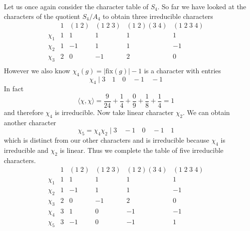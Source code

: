 \documentclass[11pt, notitlepage]{article}
\numberwithin{equation}{section}
\theoremstyle{plain}
\theoremstyle{definition}
\newenvironment{example}
	{\pushQED{\qed}\renewcommand{\qedsymbol}{$\blacktriangleleft$}\examplex}
	{\popQED\endexamplex}
\begin{document}
\begin{example}
Let us once again consider the character table of $S_4$. So far we have looked at the characters of the quotient $S_4/A_4$ to obtain three irreducible characters
\[
    \begin{array}{c|ccccc}
	    	   & 1  &  (1\;2)    &  (1\;2\;3)  &  (1\;2)(3\;4)  &  (1\;2\;3\;4) \\\hline
	\chi_1     & 1  &      1     &    1        &        1       &        1      \\
	\chi_2     & 1  &     -1     &    1        &        1       &       -1      \\
	\chi_3     & 2  &      0     &   -1        &        2       &        0      \\
    \end{array}
\]
However we also know $\chi_4(g) = |\text{fix}(g)|-1$ is a character with entries
\[
	\chi_4 \mid 3 \quad 1 \quad 0 \quad -1 \quad -1
\]
In fact 
\[
	\langle \chi, \chi \rangle = \frac{9}{24} + \frac{1}{4} + \frac{0}{9} + \frac{1}{8} + \frac{1}{4} = 1
\]
and therefore $\chi_4$ is irreducible. Now take linear character $\chi_2$. We can obtain another character
\[
	\chi_5 = \chi_4\chi_2 \mid 3 \quad -1 \quad 0 \quad -1 \quad 1
\]
which is distinct from our other characters and is irreducible because $\chi_4$ is irreducible and $\chi_2$ is linear. Thus we complete the table of five irreducible characters.
\[
    \begin{array}{c|ccccc}
	    	   & 1  &  (1\;2)    &  (1\;2\;3)  &  (1\;2)(3\;4)  &  (1\;2\;3\;4) \\\hline
	\chi_1     & 1  &      1     &    1        &        1       &        1      \\
	\chi_2     & 1  &     -1     &    1        &        1       &       -1      \\
	\chi_3     & 2  &      0     &   -1        &        2       &        0      \\
	\chi_4     & 3  &      1     &    0        &       -1       &       -1      \\
	\chi_5     & 3  &     -1     &    0        &       -1       &        1      \\
    \end{array}
\]
\end{example}










\end{document}
